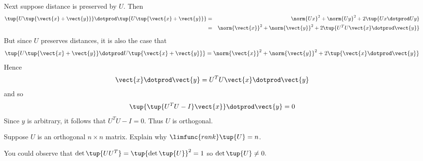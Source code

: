 \begin{enumialphparenastyle}
\begin{ex}
\begin{sol}
 Next suppose distance is
preserved by $U$. Then
\begin{eqnarray*}
\tup{U\tup{\vect{x}+\vect{y}}}  \dotprod \tup{U\tup{\vect{x}+\vect{y}
} } &=&\norm{Ux} ^{2}+\norm{Uy}
^{2}+2 \tup{Ux \dotprod Uy} \\
&=&\norm{\vect{x}} ^{2}+\norm{\vect{y}}
^{2}+2\tup{U^{T}U\vect{x} \dotprod \vect{y}}
\end{eqnarray*}
But since $U$ preserves distances, it is also the case that
\[
\tup{U\tup{\vect{x}+\vect{y}} \dotprod U\tup{\vect{x}+\vect{y}
} } =\norm{\vect{x}} ^{2}+\norm{\vect{y}
} ^{2}+2\tup{\vect{x}\dotprod \vect{y}}
\]
Hence
\[
 \vect{x} \dotprod \vect{y} = U^{T}U\vect{x} \dotprod \vect{y}
\]
and so
\[
\tup{\tup{U^{T}U-I} \vect{x}} \dotprod \vect{y} =0
\]
Since $y$ is arbitrary, it follows that $U^{T}U-I=0$. Thus $U$ is orthogonal.
\end{sol}
\end{ex}

\begin{ex} Suppose $U$ is an orthogonal $n\times n$ matrix. Explain why $\limfunc{rank}\tup{U} =n$.
\begin{sol}
You could observe that $\det \tup{UU^{T}}
=\tup{\det \tup{U} } ^{2}=1$ so $\det \tup{U} \neq 0.
$
\end{sol}
\end{ex}


\end{enumialphparenastyle}
